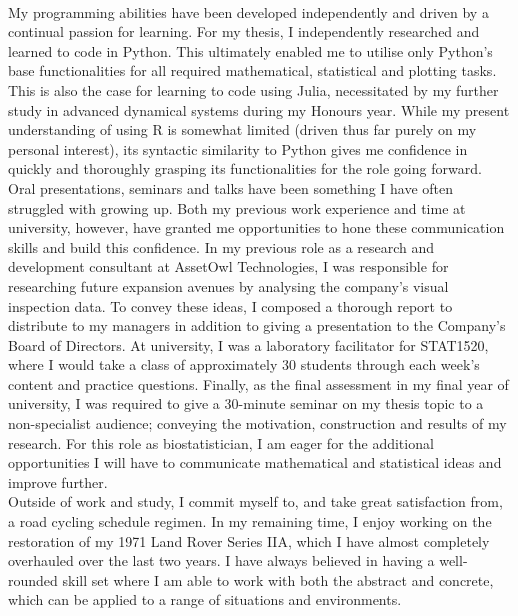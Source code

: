 \documentclass[11pt,a4paper,roman]{moderncv}
\begin{document}
\vspace{1em}
\\
My programming abilities have been developed independently and driven by a continual passion for learning. For my thesis, I independently researched and learned to code in Python. This ultimately enabled me to utilise only Python's base functionalities for all required mathematical, statistical and plotting tasks. This is also the case for learning to code using Julia, necessitated by my further study in advanced dynamical systems during my Honours year. While my present understanding of using R is somewhat limited (driven thus far purely on my personal interest), its syntactic similarity to Python gives me confidence in quickly and thoroughly grasping its functionalities for the role going forward.
\vspace{1em}
\\
Oral presentations, seminars and talks have been something I have often struggled with growing up. Both my previous work experience and time at university, however, have granted me opportunities to hone these communication skills and build this confidence. In my previous role as a research and development consultant at AssetOwl Technologies, I was responsible for researching future expansion avenues by analysing the company's visual inspection data. To convey these ideas, I composed a thorough report to distribute to my managers in addition to giving a presentation to the Company's Board of Directors. At university, I was a laboratory facilitator for STAT1520, where I would take a class of approximately 30 students through each week's content and practice questions. Finally, as the final assessment in my final year of university, I was required to give a 30-minute seminar on my thesis topic to a non-specialist audience; conveying the motivation, construction and results of my research. For this role as biostatistician, I am eager for the additional opportunities I will have to communicate mathematical and statistical ideas and improve further.
\vspace{1em}
\\
Outside of work and study, I commit myself to, and take great satisfaction from, a road cycling schedule regimen. In my remaining time, I enjoy working on the restoration of my 1971 Land Rover Series IIA, which I have almost completely overhauled over the last two years. I have always believed in having a well-rounded skill set where I am able to work with both the abstract and concrete, which can be applied to a range of situations and environments.
\vspace{0.5cm}

\makeletterclosing
\end{document}

